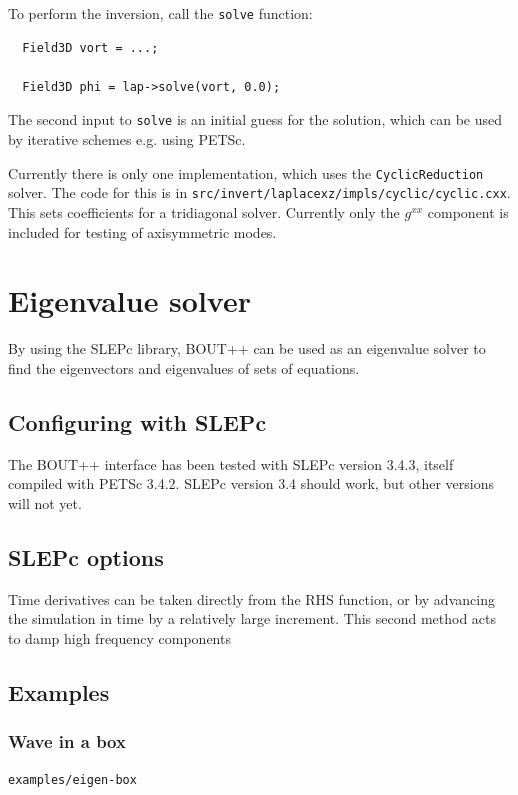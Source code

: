 \documentclass[12pt]{article}
\begin{document}
To perform the inversion, call the \lstinline!solve! function:
\begin{lstlisting}
  Field3D vort = ...;

  Field3D phi = lap->solve(vort, 0.0);
\end{lstlisting}
The second input to \lstinline!solve! is an initial guess for the solution,
which can be used by iterative schemes e.g. using PETSc.

Currently there is only one implementation, which uses the \texttt{CyclicReduction} solver. The code for this is in \texttt{src/invert/laplacexz/impls/cyclic/cyclic.cxx}. This sets coefficients for a tridiagonal solver. Currently only the $g^{xx}$ component is included for testing of axisymmetric modes.

\section{Eigenvalue solver}

By using the SLEPc library, BOUT++ can be used as an eigenvalue solver
to find the eigenvectors and eigenvalues of sets of equations.

\subsection{Configuring with SLEPc}

The BOUT++ interface has been tested with SLEPc version 3.4.3, itself compiled with 
PETSc 3.4.2. SLEPc version 3.4 should work, but other versions will not yet.


\subsection{SLEPc options}


Time derivatives can be taken directly from the RHS function,
or by advancing the simulation in time by a relatively large increment.
This second method acts to damp high frequency components

\subsection{Examples}

\subsubsection{Wave in a box}

\texttt{examples/eigen-box}
\end{document}
